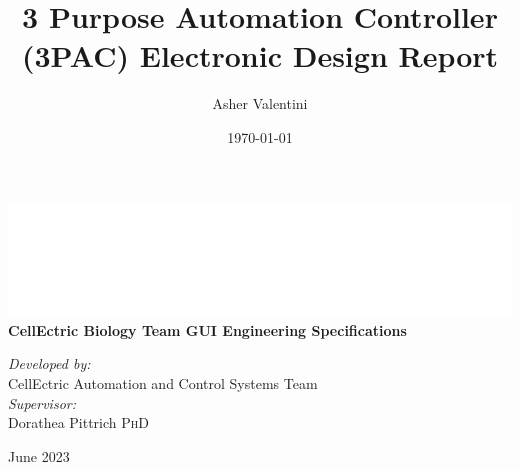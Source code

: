 \documentclass[11pt, a4paper]{report}
\title{3 Purpose Automation Controller (3PAC) Electronic Design Report}
\author{Asher Valentini}
\date{\today}
\begin{document}

\begin{titlepage}
    \pagecolor{mycolor}\afterpage{\nopagecolor}
    \color{mytextcolor}


    \begin{center}
        \includegraphics[width=0.5\linewidth]{images/whitelogo.png}\\[1cm]

        {\huge \bfseries CellEctric Biology Team GUI Engineering Specifications}\\[1cm]

        \begin{minipage}{0.6\textwidth}
            \centering
            \large
            \emph{Developed by:}\\
            CellEctric Automation and Control Systems Team\\[0.5cm]

            \emph{Supervisor:}\\
            Dorathea Pittrich \textsc{PhD}
        \end{minipage}

        \vfill

        {\large June 2023}
    \end{center}
\end{titlepage}
\end{document}
